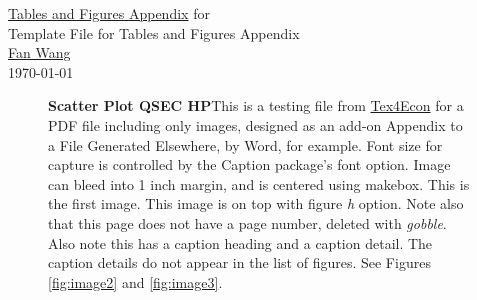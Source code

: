 \documentclass{article}
\newcommand{\mycaption}[2]{%
  \caption[#1]{\textbf{#1}\newline\normalsize#2}%
}
\begin{document}
\begingroup
  \centering
  \LARGE \href{https://github.com/FanWangEcon/Tex4Econ/tree/master/template/fantemplate_image_appendix}{Tables and Figures Appendix} for \\[1.0em]
   Template File for Tables and Figures Appendix \\[1.0em]
  \large \href{http://fanwangecon.github.io/}{Fan Wang} \\[0.5em]
  \large \today \\[1.0em]\par
\endgroup

\listoffigures

\pagebreak
\clearpage

\begin{figure}[h]
\mycaption{Scatter Plot QSEC HP}{This is a testing file from \href{https://fanwangecon.github.io/Tex4Econ/}{Tex4Econ} for a PDF file including only images, designed as an add-on Appendix to a File Generated Elsewhere, by Word, for example. Font size for capture is controlled by the Caption package's font option. Image can bleed into 1 inch margin, and is centered using makebox. This is the first image. This image is on top with figure \textit{h} option. Note also that this page does not have a page number, deleted with \textit{gobble}. Also note this has a caption heading and a caption detail. The caption details do not appear in the list of figures. See Figures \ref{fig:image2} and \ref{fig:image3}. \label{fig:image1}}
\hspace*{-\dimexpr\oddsidemargin+1in\relax}
\hspace*{-\paperwidth}
\end{figure}
\end{document}
